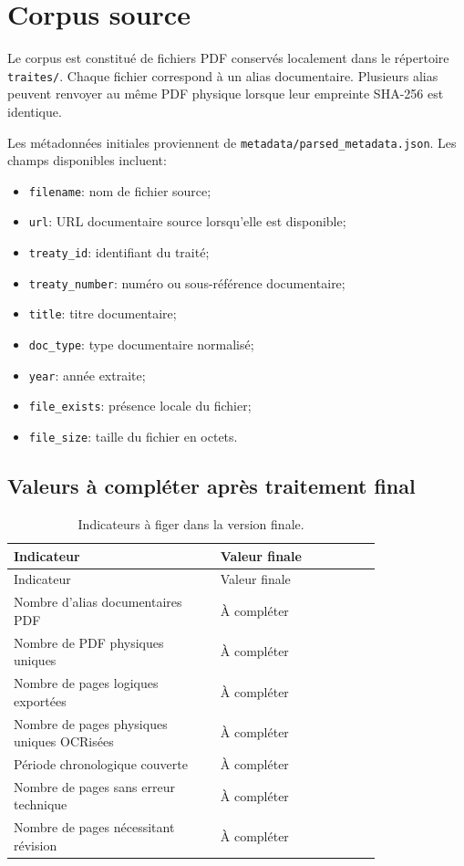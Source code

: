 \documentclass[11pt,a4paper]{article}
\begin{document}
\section{Corpus source}

Le corpus est constitué de fichiers PDF conservés localement dans le répertoire \texttt{traites/}. Chaque fichier correspond à un alias documentaire. Plusieurs alias peuvent renvoyer au même PDF physique lorsque leur empreinte SHA-256 est identique.

Les métadonnées initiales proviennent de \texttt{metadata/parsed\_metadata.json}. Les champs disponibles incluent:

\begin{itemize}
  \item \texttt{filename}: nom de fichier source;
  \item \texttt{url}: URL documentaire source lorsqu'elle est disponible;
  \item \texttt{treaty\_id}: identifiant du traité;
  \item \texttt{treaty\_number}: numéro ou sous-référence documentaire;
  \item \texttt{title}: titre documentaire;
  \item \texttt{doc\_type}: type documentaire normalisé;
  \item \texttt{year}: année extraite;
  \item \texttt{file\_exists}: présence locale du fichier;
  \item \texttt{file\_size}: taille du fichier en octets.
\end{itemize}

\subsection{Valeurs à compléter après traitement final}

\begin{longtable}{p{0.45\linewidth}p{0.35\linewidth}}
\caption{Indicateurs à figer dans la version finale.}\\
\toprule
Indicateur & Valeur finale \\
\midrule
\endfirsthead
\toprule
Indicateur & Valeur finale \\
\midrule
\endhead
Nombre d'alias documentaires PDF & À compléter \\
Nombre de PDF physiques uniques & À compléter \\
Nombre de pages logiques exportées & À compléter \\
Nombre de pages physiques uniques OCRisées & À compléter \\
Période chronologique couverte & À compléter \\
Nombre de pages sans erreur technique & À compléter \\
Nombre de pages nécessitant révision & À compléter \\
\bottomrule
\end{longtable}
\end{document}
